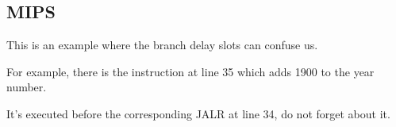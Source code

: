 \subsection{MIPS}



This is an example where the branch delay slots can confuse us.

For example, there is the instruction  at line 35 which adds 1900 to the year number.

It's executed before the corresponding JALR at line 34, do not forget about it.

